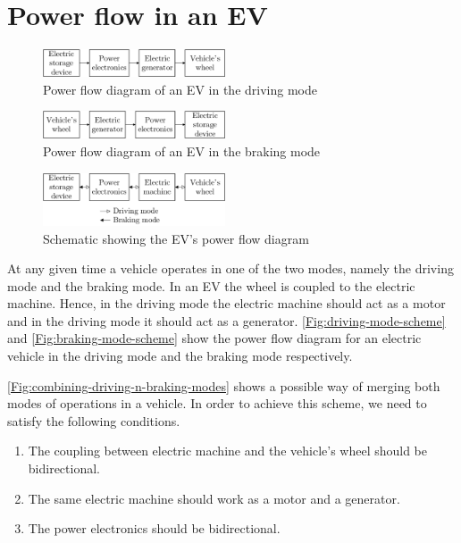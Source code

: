 \documentclass[journal]{IEEEtran}
\begin{document}
\section{Power flow in an EV}
\begin{figure}
	\centering
	\includegraphics[width=0.48\textwidth]{driving-mode-scheme}
	\caption{Power flow diagram of an EV in the driving mode}
	\label{Fig:driving-mode-scheme}
\end{figure}
\begin{figure}
	\centering
	\includegraphics[width=0.48\textwidth]{braking-mode-scheme}
	\caption{Power flow diagram of an EV in the braking mode}
	\label{Fig:braking-mode-scheme}
\end{figure}
\begin{figure}
	\centering
	\includegraphics[width=0.48\textwidth]{combining-driving-n-braking-modes}
	\caption{Schematic showing the EV's power flow diagram}
	\label{Fig:combining-driving-n-braking-modes}
\end{figure}
At any given time a vehicle operates in one of the two modes, namely the driving mode and the braking mode. In an EV the wheel is coupled to the electric machine. Hence, in the driving mode the electric machine should act as a motor and in the driving mode it should act as a generator. \autoref{Fig:driving-mode-scheme} and \autoref{Fig:braking-mode-scheme} show the power flow diagram for an electric vehicle in the driving mode and the braking mode respectively.

\autoref{Fig:combining-driving-n-braking-modes} shows a possible way of merging both modes of operations in a vehicle. In order to achieve this scheme, we need to satisfy the following conditions.

\begin{tcolorbox}[colback=blue!0!white,colframe=blue!75!black,title=Conditions]
\begin{enumerate}
  \item The coupling between electric machine and the vehicle's wheel should be bidirectional.
  \item The same electric machine should work as a motor and a generator.
  \item The power electronics should be bidirectional.
\end{enumerate}
\end{tcolorbox}
\end{document}
